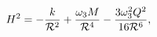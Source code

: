 \begin{equation}
\label{1eq18} H^2 =-\frac{k}{{\cal R}^2} +\frac{\omega_3 M}{{\cal
R}^4} -\frac{3 \omega^2_3 Q^2}{16{\cal R}^6},
\end{equation}

